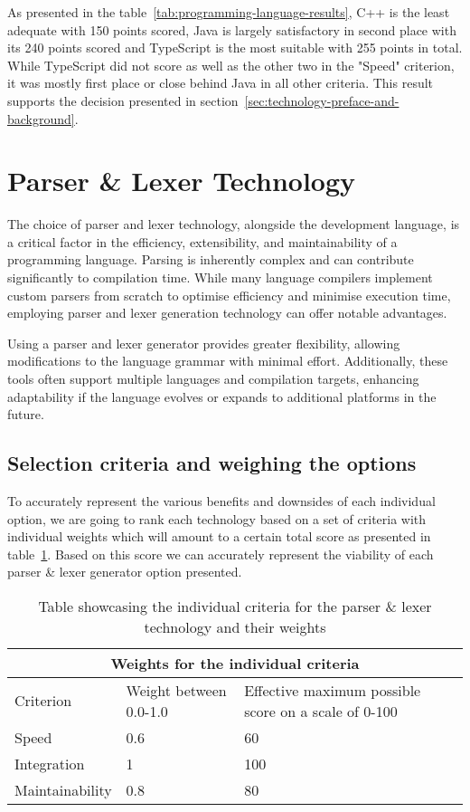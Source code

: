 As presented in the table~\ref{tab:programming-language-results}, C++ is the least adequate with 150 points scored, Java is largely satisfactory in second place with its 240 points scored and TypeScript is the most suitable with 255 points in total. While TypeScript did not score as well as the other two in the "Speed" criterion, it was mostly first place or close behind Java in all other criteria. This result supports the decision presented in section~\ref{sec:technology-preface-and-background}.

\section{Parser \& Lexer Technology}

The choice of parser and lexer technology, alongside the development language, is a critical factor in the efficiency, extensibility, and maintainability of a programming language. Parsing is inherently complex and can contribute significantly to compilation time. While many language compilers implement custom parsers from scratch to optimise efficiency and minimise execution time, employing parser and lexer generation technology can offer notable advantages.

Using a parser and lexer generator provides greater flexibility, allowing modifications to the language grammar with minimal effort. Additionally, these tools often support multiple languages and compilation targets, enhancing adaptability if the language evolves or expands to additional platforms in the future.

\subsection{Selection criteria and weighing the options}
\label{sec:parser-and-lexer-technology-selection-criteria}

To accurately represent the various benefits and downsides of each individual option, we are going to rank each technology based on a set of criteria with individual weights which will amount to a certain total score as presented in table~\ref{tab:parser-and-lexer-technology-selection-criteria}. Based on this score we can accurately represent the viability of each parser \& lexer generator option presented.

\begin{table}[H]
	\centering
	\begin{tabular}{ |p{4cm}|p{5cm}|p{5cm}|  }
		\hline
		\multicolumn{3}{|c|}{Weights for the individual criteria} \\
		\hline
		Criterion&Weight between 0.0-1.0&Effective maximum possible score on a scale of 0-100\\
		\hline
		Speed&0.6&60\\
		Integration&1&100\\
		Maintainability&0.8&80\\
		\hline
	\end{tabular}
	\caption{Table showcasing the individual criteria for the parser \& lexer technology and their weights}
	\label{tab:parser-and-lexer-technology-selection-criteria}
\end{table}

